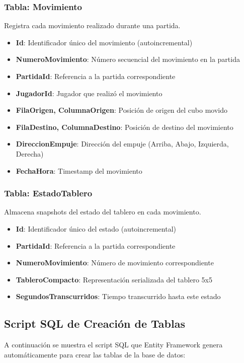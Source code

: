 \documentclass[12pt]{article}
\begin{document}
\subsubsection*{Tabla: Movimiento}
Registra cada movimiento realizado durante una partida.
\begin{itemize}
    \item \textbf{Id}: Identificador único del movimiento (autoincremental)
    \item \textbf{NumeroMovimiento}: Número secuencial del movimiento en la partida
    \item \textbf{PartidaId}: Referencia a la partida correspondiente
    \item \textbf{JugadorId}: Jugador que realizó el movimiento
    \item \textbf{FilaOrigen, ColumnaOrigen}: Posición de origen del cubo movido
    \item \textbf{FilaDestino, ColumnaDestino}: Posición de destino del movimiento
    \item \textbf{DireccionEmpuje}: Dirección del empuje (Arriba, Abajo, Izquierda, Derecha)
    \item \textbf{FechaHora}: Timestamp del movimiento
\end{itemize}

\subsubsection*{Tabla: EstadoTablero}
Almacena snapshots del estado del tablero en cada movimiento.
\begin{itemize}
    \item \textbf{Id}: Identificador único del estado (autoincremental)
    \item \textbf{PartidaId}: Referencia a la partida correspondiente
    \item \textbf{NumeroMovimiento}: Número de movimiento correspondiente
    \item \textbf{TableroCompacto}: Representación serializada del tablero 5x5
    \item \textbf{SegundosTranscurridos}: Tiempo transcurrido hasta este estado
\end{itemize}

\subsection*{Script SQL de Creación de Tablas}

A continuación se muestra el script SQL que Entity Framework genera automáticamente para crear las tablas de la base de datos:
\end{document}
